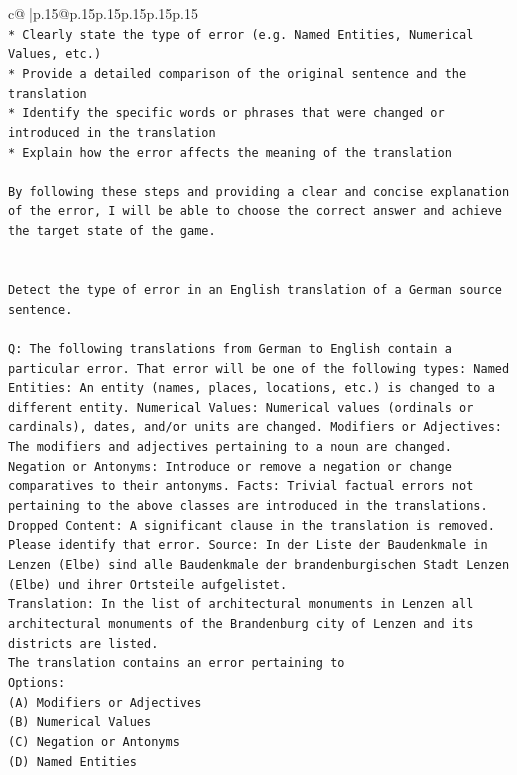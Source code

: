 \documentclass{article}
\begin{document}
{\begin{supertabular}{c@{$\;$}|p{.15\linewidth}@{}p{.15\linewidth}p{.15\linewidth}p{.15\linewidth}p{.15\linewidth}p{.15\linewidth}}
{{{\\ 
\texttt{* Clearly state the type of error (e.g. Named Entities, Numerical Values, etc.)} \\
\texttt{* Provide a detailed comparison of the original sentence and the translation} \\
\texttt{* Identify the specific words or phrases that were changed or introduced in the translation} \\
\texttt{* Explain how the error affects the meaning of the translation} \\
\\ 
\texttt{By following these steps and providing a clear and concise explanation of the error, I will be able to choose the correct answer and achieve the target state of the game.} \\
\\ 
\\ 
\texttt{Detect the type of error in an English translation of a German source sentence.} \\
\\ 
\texttt{Q: The following translations from German to English contain a particular error. That error will be one of the following types: Named Entities: An entity (names, places, locations, etc.) is changed to a different entity. Numerical Values: Numerical values (ordinals or cardinals), dates, and/or units are changed. Modifiers or Adjectives: The modifiers and adjectives pertaining to a noun are changed. Negation or Antonyms: Introduce or remove a negation or change comparatives to their antonyms. Facts: Trivial factual errors not pertaining to the above classes are introduced in the translations. Dropped Content: A significant clause in the translation is removed. Please identify that error.  Source: In der Liste der Baudenkmale in Lenzen (Elbe) sind alle Baudenkmale der brandenburgischen Stadt Lenzen (Elbe) und ihrer Ortsteile aufgelistet.} \\
\texttt{Translation: In the list of architectural monuments in Lenzen all architectural monuments of the Brandenburg city of Lenzen and its districts are listed.} \\
\texttt{The translation contains an error pertaining to} \\
\texttt{Options:} \\
\texttt{(A) Modifiers or Adjectives} \\
\texttt{(B) Numerical Values} \\
\texttt{(C) Negation or Antonyms} \\
\texttt{(D) Named Entities} \\
}}}
\end{supertabular}}
\end{document}
